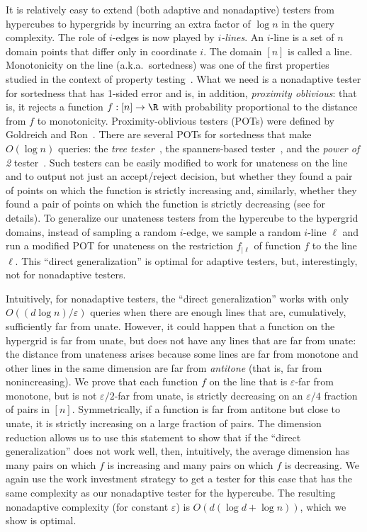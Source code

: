 \documentclass{toc}
\newcommand{\eps}{\varepsilon}
\newcommand{\Sec}[1]{\expref{Section}{sec:#1}}
\begin{document}
It is relatively easy to extend (both adaptive and nonadaptive) testers from hypercubes to hypergrids by incurring an extra factor of $\log n$ in the query complexity. The role of $i$-edges is now played by \emph{$i$-lines}. An $i$-line is a set of $n$ domain points that differ only in coordinate $i$. The domain $[n]$ is called a line.
Monotonicity on the line (a.k.a.\ sortedness) was one of the first properties studied in the context of property testing~\cite{EKKRV00}. What we need is a nonadaptive tester for sortedness that has 1-sided error and is, in addition, \emph{proximity oblivious}: that is, it rejects a function $f:[n]\to\R$ with probability proportional to the distance from $f$ to monotonicity. Proximity-oblivious testers (POTs) were defined by Goldreich and Ron~\cite{GR11}. There are several POTs for sortedness that make $O(\log n)$ queries: the \emph{tree tester}~\cite{EKKRV00}, the spanners-based tester~\cite{BGJRW12, Ras10}, and the \emph{power of 2} tester~\cite{CS13}.
Such testers can be easily modified to work for unateness on the line and to output not just an accept/reject decision, but whether they found a pair of points on which the function is strictly increasing and, similarly, whether they found a pair of points on which the function is strictly decreasing (see \Sec{hypergrids} for details).
To generalize our unateness testers from the hypercube to the hypergrid domains, instead
of sampling a random $i$-edge, we sample a random $i$-line $\ell$ and run a modified POT for unateness on 
%
the restriction $f_{|\ell}$ of function $f$ to the line $\ell$.
This ``direct generalization'' is optimal for adaptive testers, but, interestingly, not for nonadaptive testers.

Intuitively, for nonadaptive testers, the ``direct generalization'' works with only $O(({d\log n})/\eps)$ queries when there are enough lines that are, cumulatively, sufficiently far from unate. However, it could happen that a function on the hypergrid is far from unate, but does not have any lines that are far from unate: the distance from unateness arises because some lines are far from monotone and other lines in the same dimension are far from 
%
%
\emph{antitone} %
(that is, %
far from nonincreasing).  %
%
We prove that each function $f$ on the line that is $\eps$-far from monotone, but is not $\eps/2$-far from unate, is strictly 
%
%
decreasing
on
an  %
$\eps/4$ fraction of pairs in $[n]$. Symmetrically, if a function is far from 
%
%
antitone %
but close to unate, it is strictly 
%
increasing 
%
on a large fraction of pairs. The dimension reduction allows us to use this statement to show that if the ``direct generalization'' does not work well, then, intuitively, the average dimension has many pairs on which $f$ is increasing and many pairs on which $f$ is decreasing. We again use
the %
work investment strategy to get a tester for this case that has the same complexity as our nonadaptive tester for the hypercube.
The resulting nonadaptive complexity (for constant $\eps$) is $O(d(\log d + \log n))$, which we show is optimal.
\end{document}

